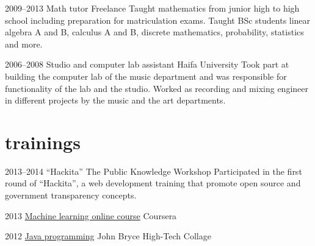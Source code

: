 \documentclass[]{friggeri-cv}  %
\begin{document}
\begin{entrylist}

    \entry
    {2009--2013}
    {Math tutor}
    {Freelance}
    {Taught mathematics from junior high to high school including preparation for matriculation exams. Taught BSc students linear algebra A and B, calculus A and B, discrete mathematics, probability, statistics and more.}

\end{entrylist}
\begin{entrylist}

    \entry
    {2006--2008}
    {Studio and computer lab assistant}
    {Haifa University}
    {Took part at building the computer lab of the music department and was responsible for functionality of the lab and the studio. Worked as recording and mixing engineer in different projects by the music and the art departments.}

\end{entrylist}


\section{trainings}

\begin{entrylist}

    \entry
    {2013--2014}
    {“Hackita”}
    {The Public Knowledge Workshop}
    {Participated in the first round of ``Hackita'', a web development training that promote open source and government transparency concepts.}

\end{entrylist}
\begin{entrylist}

    \entry
    {2013}
    {\href{http://db.tt/hcPmtUpn}{Machine learning online course}}
    {Coursera}

\end{entrylist}
\begin{entrylist}

    \entry
    {2012}
    {\href{http://db.tt/g3VdmoOu}{Java programming}}
    {John Bryce High-Tech Collage}
    
\end{entrylist}

\end{document}
